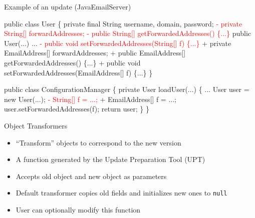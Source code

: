 \begin{frame}[fragile,shrink=5]{Example of an update (JavaEmailServer)}%
\newcommand{\removed}[1]{\textcolor{red}{- #1}}
\newcommand{\addedxx}[1]{\textcolor{OliveGreen}{+ #1}}
\begin{\ExampleCodeSize}
\begin{semiverbatim}
  public class User \{
    private final String username, domain, password;
\removed{  private String[] forwardAddresses;}
\removed{  public String[] getForwardedAddresses() \{...\}}
    public User(...) {...}
\removed{  public void setForwardedAddresses(String[] f) \{...\}}
\addedxx{  private EmailAddress[] forwardAddresses;}
\addedxx{  public EmailAddress[] getForwardedAddresses() \{...\}}
\addedxx{  public void setForwardedAddresses(EmailAddress[] f) \{...\}}
  \}

  public class ConfigurationManager \{
    private User loadUser(...) \{
       ...
       User user = new User(...);
\removed{     String[] f = ...;}
\addedxx{     EmailAddress[] f = ...;}
       user.setForwardedAddresses(f);
       return user;
    \}
  \}
\end{semiverbatim}
\end{\ExampleCodeSize}
\end{frame}

\begin{frame}{Object Transformers}%
\begin{itemize}
\item ``Transform'' objects to correspond to the new version
\item A function generated by the Update Preparation Tool (UPT)
\item Accepts old object and new object as parameters
\item Default transformer copies old fields and initializes new ones to
\texttt{null}
\item User can optionally modify this function
\end{itemize}
\end{frame}

